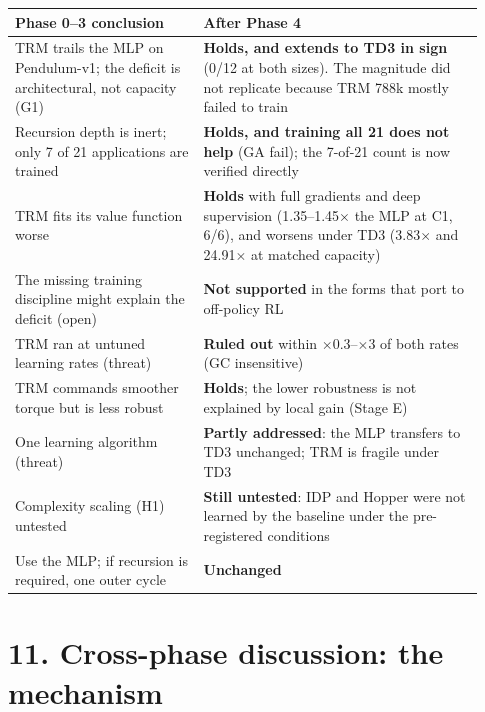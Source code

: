 \documentclass[11pt]{article}
\begin{document}
\begin{center}\small\begin{tabular}{>{\raggedright\arraybackslash}p{0.375\linewidth}>{\raggedright\arraybackslash}p{0.559\linewidth}}
\toprule
Phase 0--3 conclusion & After Phase 4 \\
\midrule
TRM trails the MLP on Pendulum-v1; the deficit is architectural, not capacity (G1) & \textbf{Holds, and extends to TD3 in sign} (0/12 at both sizes). The magnitude did not replicate because TRM 788k mostly failed to train \\
Recursion depth is inert; only 7 of 21 applications are trained & \textbf{Holds, and training all 21 does not help} (GA fail); the 7-of-21 count is now verified directly \\
TRM fits its value function worse & \textbf{Holds} with full gradients and deep supervision (1.35--1.45$\times$ the MLP at C1, 6/6), and worsens under TD3 (3.83$\times$ and 24.91$\times$ at matched capacity) \\
The missing training discipline might explain the deficit (open) & \textbf{Not supported} in the forms that port to off-policy RL \\
TRM ran at untuned learning rates (threat) & \textbf{Ruled out} within $\times$0.3--$\times$3 of both rates (GC insensitive) \\
TRM commands smoother torque but is less robust & \textbf{Holds}; the lower robustness is not explained by local gain (Stage E) \\
One learning algorithm (threat) & \textbf{Partly addressed}: the MLP transfers to TD3 unchanged; TRM is fragile under TD3 \\
Complexity scaling (H1) untested & \textbf{Still untested}: IDP and Hopper were not learned by the baseline under the pre-registered conditions \\
Use the MLP; if recursion is required, one outer cycle & \textbf{Unchanged} \\
\bottomrule
\end{tabular}\end{center}



\medskip



\section*{11. Cross-phase discussion: the mechanism}
\end{document}
